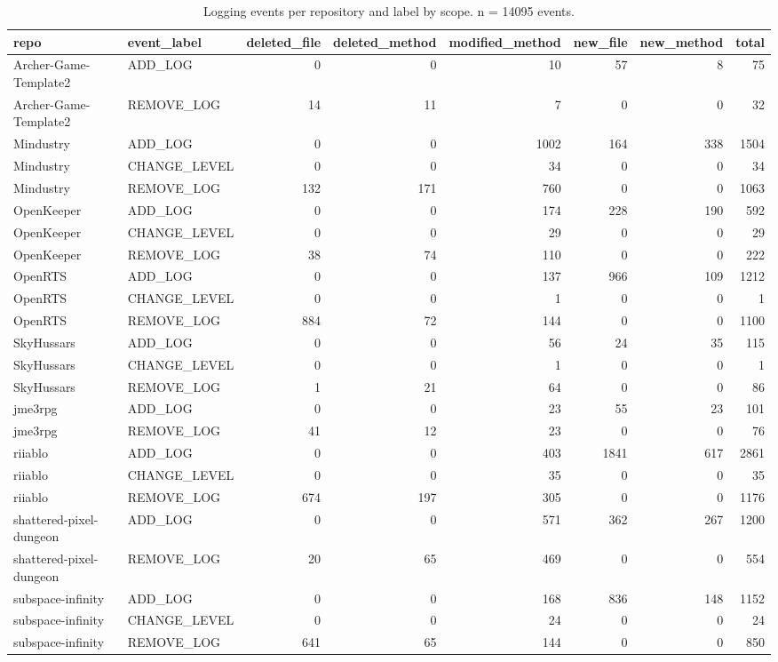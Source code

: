 \begin{table}[htbp]
\centering
\small
\caption{Logging events per repository and label by scope. n = 14095 events.}
\label{tab:rq1_events_scope}
\begin{tabular}{llrrrrrr}
\toprule
repo & event\_label & deleted\_file & deleted\_method & modified\_method & new\_file & new\_method & total \\
\midrule
Archer-Game-Template2 & ADD\_LOG & 0 & 0 & 10 & 57 & 8 & 75 \\
Archer-Game-Template2 & REMOVE\_LOG & 14 & 11 & 7 & 0 & 0 & 32 \\
Mindustry & ADD\_LOG & 0 & 0 & 1002 & 164 & 338 & 1504 \\
Mindustry & CHANGE\_LEVEL & 0 & 0 & 34 & 0 & 0 & 34 \\
Mindustry & REMOVE\_LOG & 132 & 171 & 760 & 0 & 0 & 1063 \\
OpenKeeper & ADD\_LOG & 0 & 0 & 174 & 228 & 190 & 592 \\
OpenKeeper & CHANGE\_LEVEL & 0 & 0 & 29 & 0 & 0 & 29 \\
OpenKeeper & REMOVE\_LOG & 38 & 74 & 110 & 0 & 0 & 222 \\
OpenRTS & ADD\_LOG & 0 & 0 & 137 & 966 & 109 & 1212 \\
OpenRTS & CHANGE\_LEVEL & 0 & 0 & 1 & 0 & 0 & 1 \\
OpenRTS & REMOVE\_LOG & 884 & 72 & 144 & 0 & 0 & 1100 \\
SkyHussars & ADD\_LOG & 0 & 0 & 56 & 24 & 35 & 115 \\
SkyHussars & CHANGE\_LEVEL & 0 & 0 & 1 & 0 & 0 & 1 \\
SkyHussars & REMOVE\_LOG & 1 & 21 & 64 & 0 & 0 & 86 \\
jme3rpg & ADD\_LOG & 0 & 0 & 23 & 55 & 23 & 101 \\
jme3rpg & REMOVE\_LOG & 41 & 12 & 23 & 0 & 0 & 76 \\
riiablo & ADD\_LOG & 0 & 0 & 403 & 1841 & 617 & 2861 \\
riiablo & CHANGE\_LEVEL & 0 & 0 & 35 & 0 & 0 & 35 \\
riiablo & REMOVE\_LOG & 674 & 197 & 305 & 0 & 0 & 1176 \\
shattered-pixel-dungeon & ADD\_LOG & 0 & 0 & 571 & 362 & 267 & 1200 \\
shattered-pixel-dungeon & REMOVE\_LOG & 20 & 65 & 469 & 0 & 0 & 554 \\
subspace-infinity & ADD\_LOG & 0 & 0 & 168 & 836 & 148 & 1152 \\
subspace-infinity & CHANGE\_LEVEL & 0 & 0 & 24 & 0 & 0 & 24 \\
subspace-infinity & REMOVE\_LOG & 641 & 65 & 144 & 0 & 0 & 850 \\
\bottomrule
\end{tabular}
\end{table}
